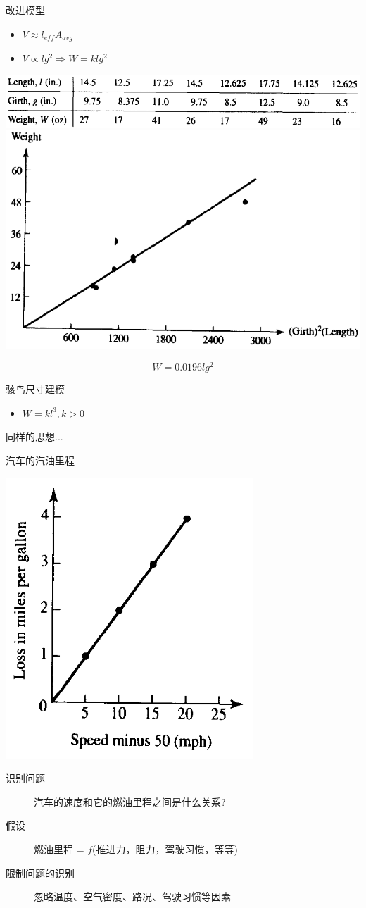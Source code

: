 \documentclass[mathserif]{beamer}
\begin{document}
\begin{frame}{改进模型}
  \begin{itemize}
  \item $V \approx l_{eff}A_{avg}$
  \item $V \propto lg^2 \Rightarrow W = klg^2$
  \end{itemize}
  \begin{center}
    \includegraphics[width=.5\textwidth{}]{fishtab2.png}
    \includegraphics[width=.4\textwidth{}]{fishlen3.png}
  \end{center}
  \[
  W = 0.0196lg^2
  \]
\end{frame}

\begin{frame}{骇鸟尺寸建模}
  \begin{itemize}
  \item $W = kl^3, k>0$
  \end{itemize}

  同样的思想...
  
\end{frame}

\begin{frame}{汽车的汽油里程}
  \begin{center}
    \includegraphics[width=.2\textwidth{}]{papersays.png}
  \end{center}

  \begin{description}
  \item[识别问题] 汽车的速度和它的燃油里程之间是什么关系?
  \item[假设] 燃油里程 = $f$(推进力，阻力，驾驶习惯，等等)
  \item[限制问题的识别] 忽略温度、空气密度、路况、驾驶习惯等因素
  \end{description}

\end{frame}
\end{document}
